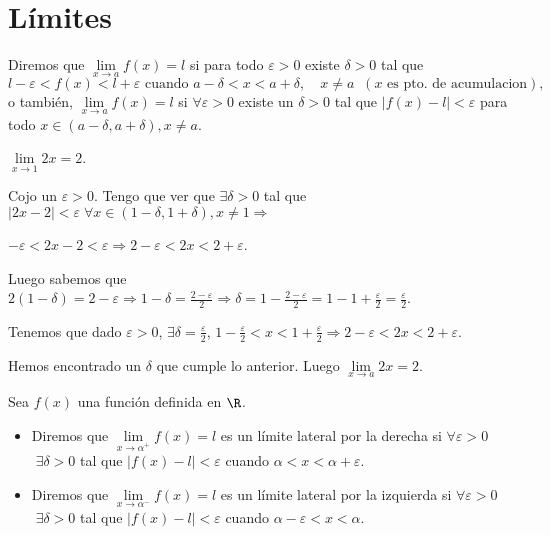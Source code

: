 \section{Límites}
\begin{definition}[Límite]
	Diremos que \(\lim\limits_{x \to a} f(x) = l \) si para todo \(\varepsilon > 0 \) existe \(\delta > 0 \) tal que
	\[
		l - \varepsilon < f(x) < l + \varepsilon \text{ cuando } a - \delta < x < a + \delta, \quad x \neq a \;\;(x \text{ es pto. de acumulacion}  ),
	\]
	o también, \(\lim\limits_{x  \to a } f(x) = l \) si \(\forall \varepsilon > 0 \) existe un \(\delta > 0 \) tal que \(|f(x) - l| < \varepsilon \) para todo \(x \in (a - \delta, a + \delta), x \neq a\).
\end{definition}
\begin{example}
	\(\lim\limits_{x  \to 1 } 2x = 2 \).

	Cojo un \(\varepsilon > 0 \). Tengo que ver que \(\exists \delta > 0 \) tal que \(|2x - 2| < \varepsilon \; \forall x \in (1-\delta, 1 + \delta), x \neq 1 \Rightarrow \)

	\(- \varepsilon < 2x - 2 < \varepsilon \Rightarrow 2 - \varepsilon < 2x < 2 + \varepsilon\).

	Luego sabemos que \(2(1-\delta) = 2 - \varepsilon \Rightarrow 1 - \delta = \frac{2 - \varepsilon}{2 } \Rightarrow \delta = 1 - \frac{2-\varepsilon}{2} = 1 -1 + \frac{\varepsilon}{2} = \frac{\varepsilon}{2}\).

	Tenemos que dado \(\varepsilon > 0 \), \(\exists \delta = \frac{\varepsilon}{2}\), \(1 - \frac{\varepsilon}{2} < x < 1 + \frac{\varepsilon}{2} \Rightarrow 2 - \varepsilon < 2x < 2 + \varepsilon\).

	Hemos encontrado un \(\delta\) que cumple lo anterior. Luego \(\lim\limits_{x  \to a } 2x = 2 \).
\end{example}
\begin{definition}
	Sea \(f(x )\) una función definida en \(\R \).

	\begin{itemize}
		\item Diremos que \(\lim\limits_{x  \to \alpha^{+} } f(x) = l  \) es un límite lateral por la derecha si \(\forall \varepsilon > 0 \) \(\; \exists \delta > 0 \) tal que \(\left\vert f(x) - l  \right\vert < \varepsilon \) cuando \(\alpha < x < \alpha + \varepsilon\).

		\item Diremos que \(\lim\limits_{x  \to \alpha^{-} } f(x) = l  \) es un límite lateral por la izquierda si \(\forall \varepsilon > 0 \) \(\; \exists \delta > 0 \) tal que \(\left\vert f(x) - l  \right\vert < \varepsilon \) cuando \(\alpha- \varepsilon < x < \alpha\).
	\end{itemize}

\end{definition}
